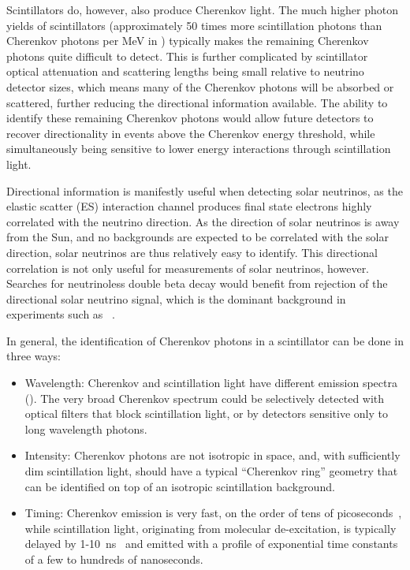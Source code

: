Scintillators do, however, also produce Cherenkov light. 
The much higher photon yields of scintillators (approximately 50 times more scintillation photons than Cherenkov photons per MeV in {\labppo}) typically makes the remaining Cherenkov photons quite difficult to detect.
This is further complicated by scintillator optical attenuation and scattering lengths being small relative to neutrino detector sizes, which means many of the Cherenkov photons will be absorbed or scattered, further reducing the directional information available.
The ability to identify these remaining Cherenkov photons would allow future detectors to recover directionality in events above the Cherenkov energy threshold, while simultaneously being sensitive to lower energy interactions through scintillation light.

Directional information is manifestly useful when detecting solar neutrinos, as the elastic scatter (ES) interaction channel produces final state electrons highly correlated with the neutrino direction. 
As the direction of solar neutrinos is away from the Sun, and no backgrounds are expected to be correlated with the solar direction, solar neutrinos are thus relatively easy to identify. 
This directional correlation is not only useful for measurements of solar neutrinos, however. Searches for neutrinoless double beta decay would benefit from rejection of the directional solar neutrino signal, which is the dominant background in experiments such as {\snop}~\cite{snop}.

In general, the identification of Cherenkov photons in a scintillator can be done in three ways:
\begin{itemize}
\item Wavelength:  Cherenkov and scintillation light have different emission spectra (). The very broad Cherenkov spectrum could be selectively detected with optical filters that block scintillation light, or by detectors sensitive only to long wavelength photons.
\item Intensity: Cherenkov photons are not isotropic in space, and, with sufficiently dim scintillation light, should have a typical ``Cherenkov ring'' geometry that can be identified on top of an isotropic scintillation background.
\item Timing: Cherenkov emission is very fast, on the order of tens of picoseconds~\cite{cherenkov}, while scintillation light, originating from molecular de-excitation, is typically delayed by 1-10~ns~\cite{birks} and emitted with a profile of exponential time constants of a few to hundreds of nanoseconds.
\end{itemize}

